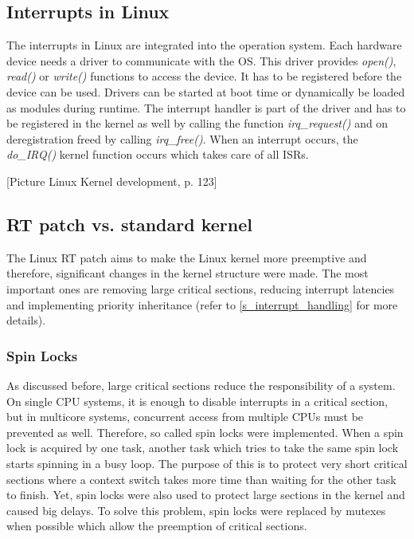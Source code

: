 \subsection{Interrupts in Linux}\label{ss_interrupts_in_linux}
The interrupts in Linux are integrated into the operation system.
Each hardware device needs a driver to communicate with the \ac{OS}.
This driver provides \textit{open()}, \textit{read()} or \textit{write()} functions to access the device. 
It has to be registered before the device can be used.
Drivers can be started at boot time or dynamically be loaded as modules during runtime.
The interrupt handler is part of the driver and has to be registered in the kernel as well by calling the function \textit{irq\_request()} and on deregistration freed by calling \textit{irq\_free()}.
When an interrupt occurs, the \textit{do\_IRQ()} kernel function occurs which takes care of all \acp{ISR}. 

[Picture Linux Kernel development, p. 123]

\subsection{RT patch vs. standard kernel}
The Linux RT patch aims to make the Linux kernel more preemptive and therefore, significant changes in the kernel structure were made.
The most important ones are removing large critical sections, reducing interrupt latencies and implementing priority inheritance (refer to \ref{s_interrupt_handling} for more details).

\subsubsection{Spin Locks}
As discussed before, large critical sections reduce the responsibility of a system.
On single \ac{CPU} systems, it is enough to disable interrupts in a critical section, but in multicore systems, concurrent access from multiple \acp{CPU} must be prevented as well.
Therefore, so called spin locks were implemented. 
When a spin lock is acquired by one task, another task which tries to take the same spin lock starts spinning in a busy loop.
The purpose of this is to protect very short critical sections where a context switch takes more time than waiting for the other task to finish.
Yet, spin locks were also used to protect large sections in the kernel and caused big delays.
To solve this problem, spin locks were replaced by mutexes when possible which allow the preemption of critical sections.   


